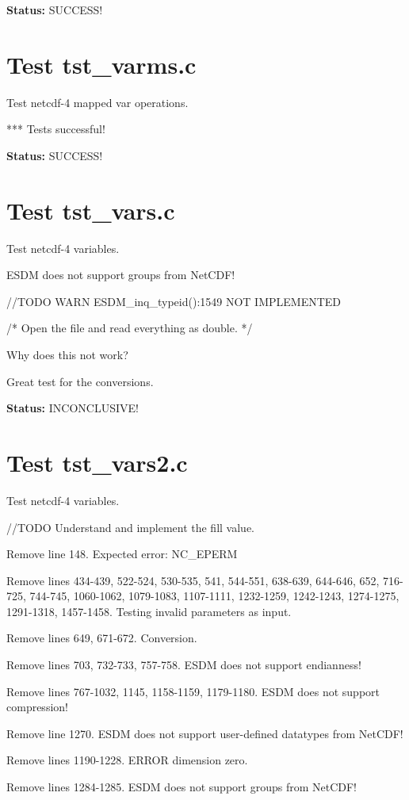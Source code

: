 {\bf \large Status: } SUCCESS!

\section{Test tst\_varms.c}

Test netcdf-4 mapped var operations.

*** Tests successful!

{\bf \large Status: } SUCCESS!

\section{Test tst\_vars.c}

Test netcdf-4 variables.

ESDM does not support groups from NetCDF!

//TODO WARN ESDM\_inq\_typeid():1549 NOT IMPLEMENTED

/* Open the file and read everything as double. */

Why does this not work?

Great test for the conversions.

{\bf \large Status: } INCONCLUSIVE!

\section{Test tst\_vars2.c}

Test netcdf-4 variables.

//TODO Understand and implement the fill value.

Remove line 148. Expected error: NC\_EPERM

Remove lines 434-439, 522-524, 530-535, 541, 544-551, 638-639, 644-646, 652, 716-725, 744-745, 1060-1062, 1079-1083, 1107-1111, 1232-1259, 1242-1243, 1274-1275, 1291-1318, 1457-1458. Testing invalid parameters as input.

Remove lines 649, 671-672. Conversion.

Remove lines 703, 732-733, 757-758. ESDM does not support endianness!

Remove lines 767-1032, 1145, 1158-1159, 1179-1180. ESDM does not support compression!

Remove line 1270. ESDM does not support user-defined datatypes from NetCDF!

Remove lines 1190-1228. ERROR dimension zero.

Remove lines 1284-1285. ESDM does not support groups from NetCDF!

